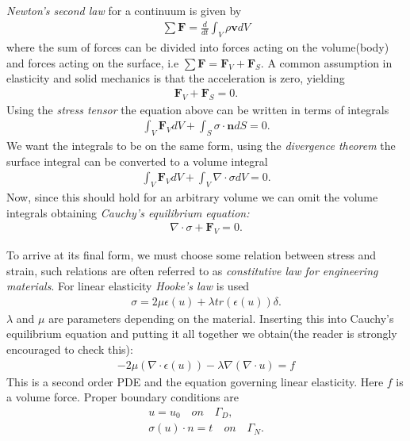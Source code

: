 \documentclass[epsfig,11pt]{article}
\begin{document}
\emph{Newton's second law} for a continuum is given by
\begin{align*}
\sum \mathbf{F} = \frac{d}{dt} \int_V \rho \mathbf{v} dV 
\end{align*}
where the sum of forces can be divided into forces acting on the volume(body) and forces acting on the surface, i.e $\sum \mathbf{F} = \mathbf{F}_V + \mathbf{F}_S$.
A common assumption in elasticity and solid mechanics is that the acceleration is zero, yielding 
\begin{align*}
\mathbf{F}_V + \mathbf{F}_S = 0.
\end{align*}
Using the \emph{stress tensor} the equation above can be written in terms of integrals
\begin{align*}
\int_V \mathbf{F}_V dV + \int_S \sigma \cdot \mathbf{n} dS = 0.
\end{align*}
We want the integrals to be on the same form, using the \emph{divergence theorem} the surface integral can be converted to a volume integral
\begin{align*}
\int_V \mathbf{F}_V dV + \int_V \nabla \cdot \sigma dV = 0.
\end{align*}
Now, since this should hold for an arbitrary volume we can omit the volume integrals obtaining \emph{Cauchy's equilibrium equation:}
\begin{align}
\nabla \cdot \sigma + \mathbf{F}_V = 0.
\end{align}

To arrive at its final form, we must choose some relation between stress and strain, such relations are often referred to as \emph{constitutive law for engineering materials}. For linear elasticity \emph{Hooke's law} is used
\begin{align}
\sigma = 2 \mu \epsilon(u) + \lambda tr(\epsilon(u))\delta.
\end{align}
$\lambda$ and $\mu$ are parameters depending on the material.  Inserting this into Cauchy's equilibrium equation and putting it all together we obtain(the reader is strongly encouraged to check this):
\begin{align}
-2 \mu (\nabla \cdot \epsilon (u)) - \lambda \nabla (\nabla \cdot u) = f 
\end{align}
This is a second order PDE and the equation governing linear elasticity. Here $f$ is a volume force. Proper boundary conditions are 
\begin{align*}
u = u_0 \quad on \quad \Gamma_D, \\
\sigma (u) \cdot n = t \quad on \quad \Gamma_N.
\end{align*} 
\end{document}
